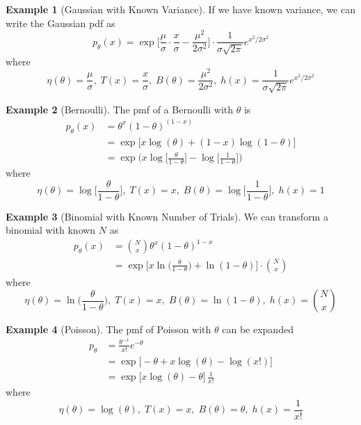 \documentclass{article}
\theoremstyle{definition}
\newtheorem{example}{Example}[section]
\begin{document}
  \begin{example}[Gaussian with Known Variance]
  If we have known variance, we can write the Gaussian pdf as 
  \[p_\theta (x) = \exp \bigg[ \frac{\mu}{\sigma} \cdot \frac{x}{\sigma} - \frac{\mu^2}{2 \sigma^2} \bigg] \cdot \frac{1}{\sigma \sqrt{2\pi}} e^{x^2/2 \sigma^2}\]
  where 
  \[\eta(\theta) = \frac{\mu}{\sigma}, \; T(x) = \frac{x}{\sigma}, \; B(\theta) = \frac{\mu^2}{2 \sigma^2}, \; h(x) = \frac{1}{\sigma \sqrt{2 \pi}} e^{x^2/2 \sigma^2}\]
  \end{example}

  \begin{example}[Bernoulli]
  The pmf of a Bernoulli with $\theta$ is 
  \begin{align*}
      p_\theta (x) & = \theta^x (1 - \theta)^{(1 - x)} \\
      & = \exp \big[x \log (\theta) + (1 - x)\log(1 - \theta) \big] \\
      & = \exp \bigg( x \log \Big[ \frac{\theta}{1 - \theta} \Big] - \log \Big[ \frac{1}{1 - \theta} \Big] \bigg)
  \end{align*}
  where 
  \[\eta(\theta) = \log \Big[ \frac{\theta}{1 - \theta} \Big], \; T(x) = x, \; B(\theta) = \log \Big[ \frac{1}{1 - \theta} \Big], \; h(x) = 1\]
  \end{example}


  \begin{example}[Binomial with Known Number of Trials]
  We can transform a binomial with known $N$ as 
  \begin{align*}
    p_\theta (x) &  = \binom{N}{x} \theta^x  (1 - \theta)^{1 - x} \\
                 & = \exp \bigg[ x \ln \big( \frac{\theta}{1 - \theta} \Big) + \ln(1 - \theta) \bigg] \cdot \binom{N}{x} 
  \end{align*}
  where 
    \[\eta (\theta) = \ln \big( \frac{\theta}{1 - \theta} \Big), \; T(x) = x, \; B(\theta) = \ln(1 - \theta), \; h(x) = \binom{N}{x}\]
  \end{example}

  \begin{example}[Poisson]
  The pmf of Poisson with $\theta$ can be expanded 
  \begin{align*}
      p_\theta & = \frac{\theta^{-x}}{x!} e^{-\theta} \\
      & = \exp \big[ -\theta + x\log(\theta) - \log(x!) \big] \\
      & = \exp \big[ x \log(\theta) - \theta \big] \, \frac{1}{x!}
  \end{align*}
  where 
  \[\eta(\theta) = \log(\theta), \; T(x) = x, \; B(\theta) = \theta, \; h(x) = \frac{1}{x!}\]
  \end{example}
\end{document}
